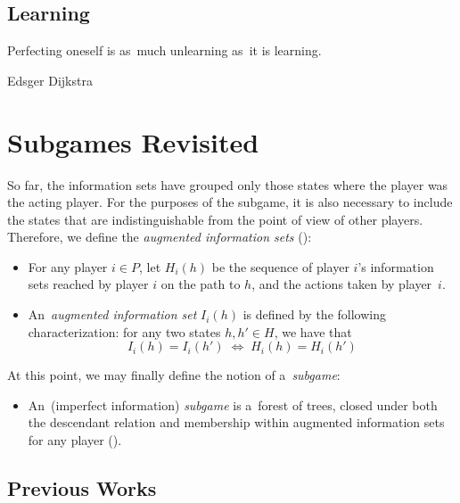 \subsection{Learning}
{
  \setlength{\epigraphwidth}{0.65\textwidth}
  \epigraph{
    Perfecting oneself is as~much unlearning as~it is learning.
  }{Edsger Dijkstra}
}%
\todo

\section{Subgames Revisited}

So far, the information sets have grouped only those states where the player was the acting player.
For the purposes of the subgame, it is also necessary to include the states that are indistinguishable from the point of view of other players.
Therefore, we define the \emph{augmented information sets} (\cite{BurchJohansonBowling13}):
\begin{itemize}
  \item For any player $i \in P$, let $H_i(h)$ be the sequence of player $i$'s information sets reached by player $i$ on the path to $h$, and the actions taken by player~$i$.
  \item An~\emph{augmented information set} $I_i(h)$ is defined by the following characterization:
    for any two states $h, h' \in H$, we have that 
    \[ I_i (h) = I_i (h') \; \Longleftrightarrow \; H_i (h) = H_i (h') \]
\end{itemize}
At this point, we may finally define the notion of a~\emph{subgame}:
\begin{itemize}
  \item An~(imperfect information) \emph{subgame} is a~forest of trees, closed under both the descendant relation and membership within augmented information sets for any player (\cite{BurchJohansonBowling13}).
\end{itemize}

\subsection{Previous Works}
